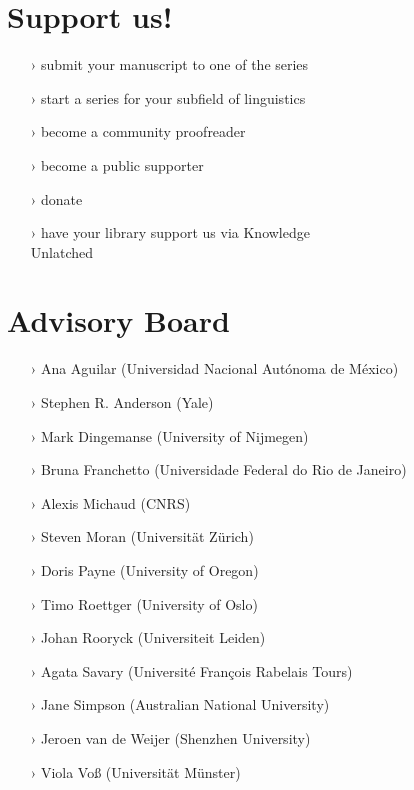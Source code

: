 \documentclass[
notumble,
nofoldmark,
]{leaflet}
\begin{document}
\vspace*{-1em}
% 
\section{\sffamily\Large\bfseries Support us!}
  
\color{LIGHTGRAY}
    \begin{itemize}
\setlength{\itemsep}{-3pt} 
      \item[›] submit your manuscript to one of the series
      \item[›] start a series for your subfield of linguistics
      \item[›] become a community proofreader  
      \item[›] become a public supporter
      \item[›] donate
      \item[›] have your library support us via Knowledge\\ Unlatched
    \end{itemize} 


  
 

\newpage 
\color{LIGHTGRAY}
\section{\sffamily\Large\bfseries Advisory Board}

\begin{itemize}
\setlength{\itemsep}{-3pt} 
 \item[›]     Ana Aguilar (Universidad Nacional Autónoma de México)
 \item[›]      Stephen R. Anderson (Yale)
 \item[›]     Mark Dingemanse (University of Nijmegen)
 \item[›]     Bruna Franchetto (Universidade Federal do Rio de Janeiro)
 \item[›]     Alexis Michaud (CNRS)
 \item[›]     Steven Moran (Universität Zürich)
 \item[›]     Doris Payne (University of Oregon)
 \item[›]     Timo Roettger (University of Oslo)
 \item[›]     Johan Rooryck (Universiteit Leiden)
 \item[›]     Agata Savary (Université François Rabelais Tours)
 \item[›]     Jane Simpson (Australian National University)
 \item[›]     Jeroen van de Weijer (Shenzhen University)
 \item[›]     Viola Voß (Universität Münster)
\end{itemize}
\end{document}
